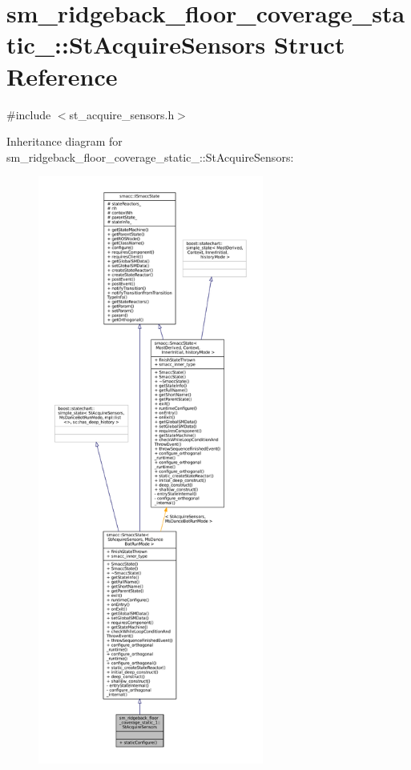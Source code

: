 \hypertarget{structsm__ridgeback__floor__coverage__static__1_1_1StAcquireSensors}{}\section{sm\+\_\+ridgeback\+\_\+floor\+\_\+coverage\+\_\+static\+\_\+:\+:St\+Acquire\+Sensors Struct Reference}
\label{structsm__ridgeback__floor__coverage__static__1_1_1StAcquireSensors}


{\ttfamily \#include $<$st\+\_\+acquire\+\_\+sensors.\+h$>$}



Inheritance diagram for sm\+\_\+ridgeback\+\_\+floor\+\_\+coverage\+\_\+static\+\_\+:\+:St\+Acquire\+Sensors\+:
\nopagebreak
\begin{figure}[H]
\begin{center}
\leavevmode
\includegraphics[height=550pt]{structsm__ridgeback__floor__coverage__static__1_1_1StAcquireSensors__inherit__graph}
\end{center}
\end{figure}



